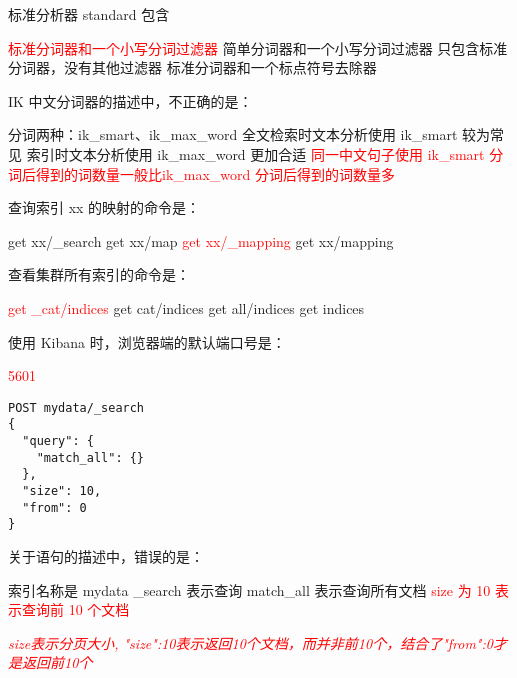 \documentclass{exam}
\begin{document}
\begin{questions}
\question
标准分析器 standard 包含
\begin{choices}
    \choice \textcolor{red}{标准分词器和一个小写分词过滤器}
    \choice 简单分词器和一个小写分词过滤器
    \choice 只包含标准分词器，没有其他过滤器
    \choice 标准分词器和一个标点符号去除器
\end{choices}

\question
IK 中文分词器的描述中，不正确的是：
\begin{choices}
    \choice 分词两种：ik\_smart、ik\_max\_word
    \choice 全文检索时文本分析使用 ik\_smart 较为常见
    \choice 索引时文本分析使用 ik\_max\_word 更加合适
    \choice \textcolor{red}{同一中文句子使用 ik\_smart 分词后得到的词数量一般比ik\_max\_word 分词后得到的词数量多}
\end{choices}

\question
查询索引 xx 的映射的命令是：
\begin{choices}
    \choice get xx/\_search
    \choice get xx/map
    \choice \textcolor{red}{get xx/\_mapping}
    \choice get xx/mapping
\end{choices}

\question
查看集群所有索引的命令是：
\begin{choices}
    \choice \textcolor{red}{get \_cat/indices}
    \choice get cat/indices
    \choice get all/indices
    \choice get indices
\end{choices}

\question
使用 Kibana 时，浏览器端的默认端口号是：
\begin{choices}
    \choice \textcolor{red}{5601}
\end{choices}

\question 
\begin{verbatim}
POST mydata/_search
{
  "query": {
    "match_all": {}
  },
  "size": 10,
  "from": 0
}
\end{verbatim}
关于语句的描述中，错误的是：
\begin{choices}
    \choice 索引名称是 mydata
    \choice \_search 表示查询
    \choice match\_all 表示查询所有文档
    \choice \textcolor{red}{size 为 10 表示查询前 10 个文档}
\end{choices}
\textit{\textcolor{red}{size表示分页大小, "size":10表示返回10个文档，而并非前10个，结合了"from":0才是返回前10个}}


\end{questions}
\end{document}
